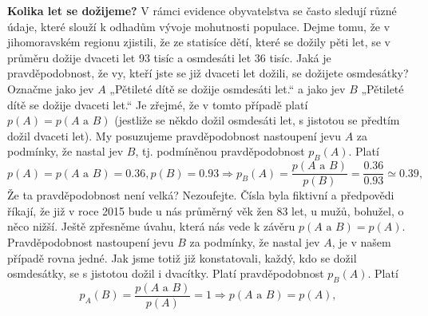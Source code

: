 \wikitextrule
\begin{example}\label{mai:exam059}
  \textbf{Kolika let se dožijeme?}\newline\small
  V rámci evidence obyvatelstva se často sledují různé údaje, které slouží k odhadům vývoje 
  mohutnosti populace. Dejme tomu, že v jihomoravském regionu zjistili, že ze statisíce dětí, které 
  se dožily pěti let, se v průměru dožije dvaceti let \num{93} tisíc a osmdesáti let \num{36} 
  tisíc. Jaká je pravděpodobnost, že vy, kteří jste se již dvaceti let dožili, se dožijete 
  osmdesátky? Označme jako jev \(A\) „Pětileté dítě se dožije osmdesáti let.“ a jako jev \(B\) 
  „Pětileté dítě se dožije dvaceti let.“ Je zřejmé, že v tomto případě platí \(p(A) = p(A\text{ a 
  }B)\) (jestliže se někdo dožil osmdesáti let, s jistotou se předtím dožil dvaceti let). My 
  posuzujeme pravděpodobnost nastoupení jevu \(A\) za podmínky, že nastal jev \(B\), tj. podmíněnou 
  pravděpodobnost \(p_B(A)\). Platí
  \begin{equation*}
    p(A)   = p(A\text{ a }B) = \num{0.36}, p(B) = \num{0.93}\Rightarrow 
    p_B(A) = \dfrac{p(A\text{ a }B)}{p(B)} = \dfrac{\num{0.36}}{\num{0.93}} \simeq \num{0.39},
  \end{equation*}
  Že ta pravděpodobnost není velká? Nezoufejte. Čísla byla fiktivní a předpovědi říkají, že již v 
  roce \num{2015} bude u nás průměrný věk žen \num{83} let, u mužů, bohužel, o něco nižší. Ještě 
  zpřesněme úvahu, která nás vede k závěru \(p(A\text{ a }B) = p(A)\). Pravděpodobnost nastoupení 
  jevu \(B\) za podmínky, že nastal jev \(A\), je v našem případě rovna jedné. Jak jsme totiž již 
  konstatovali, každý, kdo se dožil osmdesátky, se s jistotou dožil i dvacítky. Platí
  pravděpodobnost \(p_B(A)\). Platí
  \begin{equation*}
    p_A(B) = \dfrac{p(A\text{ a }B)}{p(A)} = 1 \Rightarrow p(A\text{ a }B) = p(A),
  \end{equation*}
\normalsize
\end{example}